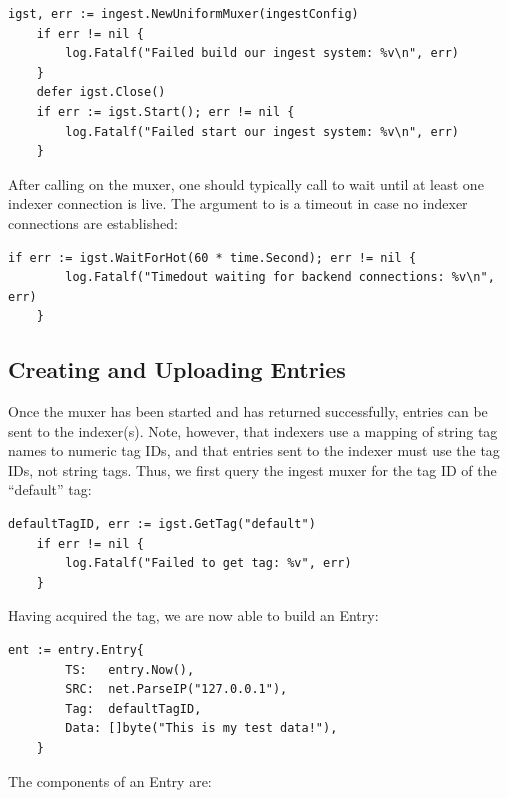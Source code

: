 \begin{Verbatim}[breaklines=true]
    igst, err := ingest.NewUniformMuxer(ingestConfig)
    if err != nil {
        log.Fatalf("Failed build our ingest system: %v\n", err)
    }
    defer igst.Close()
    if err := igst.Start(); err != nil {
        log.Fatalf("Failed start our ingest system: %v\n", err)
    }
\end{Verbatim}


After calling  on the muxer, one should typically call
 to wait until at least one indexer connection is live.
The argument to  is a timeout in case no indexer
connections are established:

\begin{Verbatim}[breaklines=true]
    if err := igst.WaitForHot(60 * time.Second); err != nil {
        log.Fatalf("Timedout waiting for backend connections: %v\n", err)
    }
\end{Verbatim}


\subsection{Creating and Uploading Entries}
Once the muxer has been started and  has returned
successfully, entries can be sent to the indexer(s). Note, however, that
indexers use a mapping of string tag names to numeric tag IDs, and that
entries sent to the indexer must use the  tag IDs, not string
tags. Thus, we first query the ingest muxer for the tag ID of the
``default'' tag:

\begin{Verbatim}[breaklines=true]
    defaultTagID, err := igst.GetTag("default")
    if err != nil {
        log.Fatalf("Failed to get tag: %v", err)
    }
\end{Verbatim}

Having acquired the tag, we are now able to build an Entry:

\begin{Verbatim}[breaklines=true]
    ent := entry.Entry{
        TS:   entry.Now(),
        SRC:  net.ParseIP("127.0.0.1"),
        Tag:  defaultTagID,
        Data: []byte("This is my test data!"),
    }

\end{Verbatim}


The components of an Entry are:

